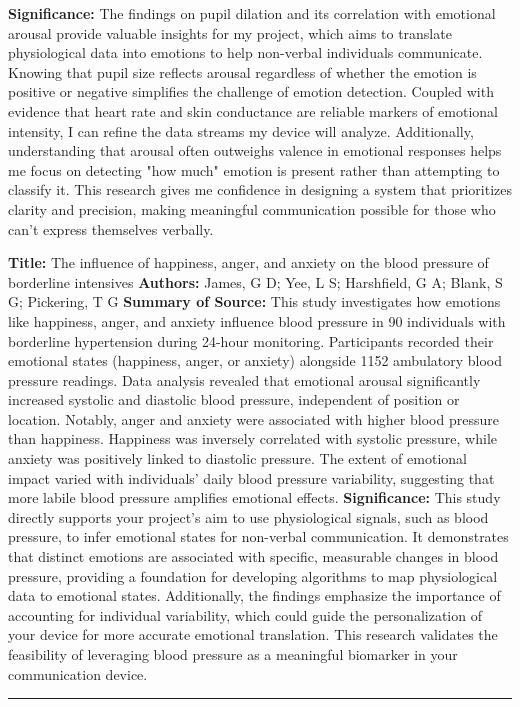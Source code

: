 \documentclass[12pt, research paper]{report}
\begin{document}
	\newline \textbf{Significance:} The findings on pupil dilation and its correlation with emotional arousal provide valuable insights for my project, which aims to translate physiological data into emotions to help non-verbal individuals communicate. Knowing that pupil size reflects arousal regardless of whether the emotion is positive or negative simplifies the challenge of emotion detection. Coupled with evidence that heart rate and skin conductance are reliable markers of emotional intensity, I can refine the data streams my device will analyze. Additionally, understanding that arousal often outweighs valence in emotional responses helps me focus on detecting "how much" emotion is present rather than attempting to classify it. This research gives me confidence in designing a system that prioritizes clarity and precision, making meaningful communication possible for those who can't express themselves verbally.
	\bigskip 
	
	\noindent \textbf{Title:} The influence of happiness, anger, and anxiety on the blood pressure of borderline intensives
	\newline \textbf{Authors:} James, G D; Yee, L S; Harshfield, G A; Blank, S G; Pickering, T G
	\newline \textbf{Summary of Source:} This study investigates how emotions like happiness, anger, and anxiety influence blood pressure in 90 individuals with borderline hypertension during 24-hour monitoring. Participants recorded their emotional states (happiness, anger, or anxiety) alongside 1152 ambulatory blood pressure readings. Data analysis revealed that emotional arousal significantly increased systolic and diastolic blood pressure, independent of position or location. Notably, anger and anxiety were associated with higher blood pressure than happiness. Happiness was inversely correlated with systolic pressure, while anxiety was positively linked to diastolic pressure. The extent of emotional impact varied with individuals' daily blood pressure variability, suggesting that more labile blood pressure amplifies emotional effects.
	\newline \textbf{Significance:} This study directly supports your project's aim to use physiological signals, such as blood pressure, to infer emotional states for non-verbal communication. It demonstrates that distinct emotions are associated with specific, measurable changes in blood pressure, providing a foundation for developing algorithms to map physiological data to emotional states. Additionally, the findings emphasize the importance of accounting for individual variability, which could guide the personalization of your device for more accurate emotional translation. This research validates the feasibility of leveraging blood pressure as a meaningful biomarker in your communication device.
	\noindent \rule{13.85cm}{0.01cm}
	
\end{document}
